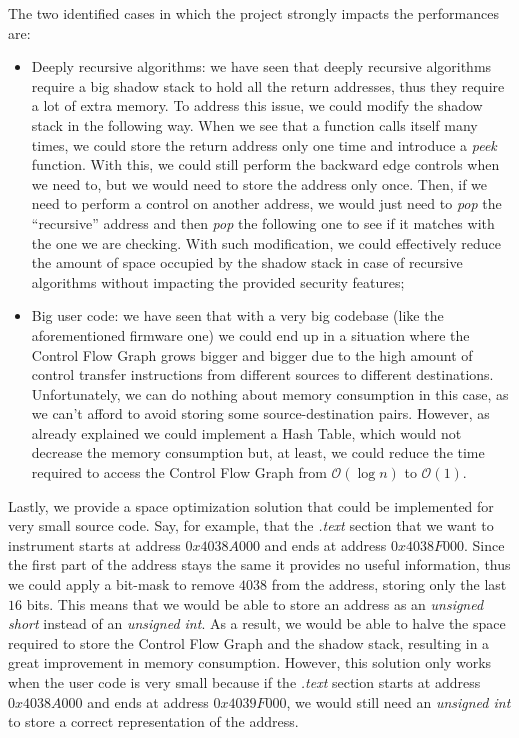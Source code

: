 The two identified cases in which the project strongly impacts the performances are:
\begin{itemize}
  \item Deeply recursive algorithms: we have seen that deeply recursive
    algorithms require a big shadow stack to hold all the return addresses, thus
    they require a lot of extra memory. To address this issue, we could modify the
    shadow stack in the following way. When we see that a function calls itself
    many times, we could store the return address only one time and introduce a \textit{peek}
    function. With this, we could still perform the backward edge controls when
    we need to, but we would need to store the address only once. Then, if we need
    to perform a control on another address, we would just need to \textit{pop} the
    ``recursive'' address and then \textit{pop} the following one to see if it
    matches with the one we are checking. With such modification, we could
    effectively reduce the amount of space occupied by the shadow stack in case
    of recursive algorithms without impacting the provided security features;

  \item Big user code: we have seen that with a very big codebase (like the aforementioned
    firmware one) we could end up in a situation where the Control Flow Graph
    grows bigger and bigger due to the high amount of control transfer
    instructions from different sources to different destinations. Unfortunately,
    we can do nothing about memory consumption in this case, as we can't afford to
    avoid storing some source-destination pairs. However, as already explained we
    could implement a Hash Table, which would not decrease the memory
    consumption but, at least, we could reduce the time required to access the
    Control Flow Graph from $\mathcal{O}(\log{n})$ to $\mathcal{O}(1)$.
\end{itemize}

Lastly, we provide a space optimization solution that could be implemented for
very small source code. Say, for example, that the \textit{.text} section that
we want to instrument starts at address $0x4038A0 00$ and ends at address
$0x4038F000$. Since the first part of the address stays the same it provides no useful
information, thus we could apply a bit-mask to remove $4038$ from the address, storing
only the last $16$ bits. This means that we would be able to store an address as
an \textit{unsigned short} instead of an \textit{unsigned int}. As a result, we
would be able to halve the space required to store the Control Flow Graph and
the shadow stack, resulting in a great improvement in memory consumption.
However, this solution only works when the user code is very small because if the
\textit{.text} section starts at address $0x4038A000$ and ends at address
$0x4039F000$, we would still need an \textit{unsigned int} to store a correct
representation of the address.

